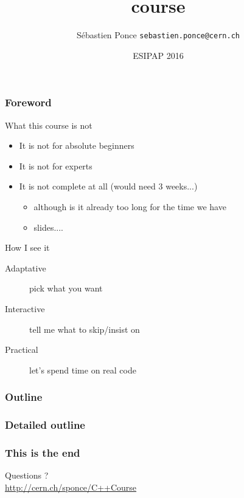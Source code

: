 \documentclass[compress]{beamer}
\title{\cpp course}
\author[S. Ponce]{S\'ebastien Ponce  \texttt{sebastien.ponce@cern.ch}}
\institute{CERN}
\date{ESIPAP 2016}
\begin{document}
\begin{frame}
  \titlepage
\end{frame}

\begin{frame}
  \frametitle{Foreword}
  \begin{block}{What this course is not}
    \begin{itemize}
    \item It is not for absolute beginners
    \item It is not for experts
    \item It is not complete at all (would need 3 weeks...)
      \begin{itemize}
      \item although is it already too long for the time we have
      \item \inserttotalframenumber{} slides....
      \end{itemize}
    \end{itemize}
  \end{block}
  \begin{block}{How I see it}
    \begin{description}
    \item[Adaptative] pick what you want
    \item[Interactive] tell me what to skip/insist on
    \item[Practical] let's spend time on real code
    \end{description}
  \end{block}
\end{frame}

\begin{frame}
  \frametitle{Outline}
  \tableofcontents[sectionstyle=show,subsectionstyle=hide]
\end{frame}

\begin{frame}
  \frametitle{Detailed outline}
  \vspace{-0.5cm}
  \begin{scriptsize}
    \begin{multicols}{2}
      \tableofcontents[sectionstyle=show,subsectionstyle=show]
    \end{multicols}
  \end{scriptsize}
\end{frame}







\begin{frame}
  \frametitle{This is the end}
  \begin{center}
    \Huge Questions ?\\
    \vspace{.5cm}
    \tiny \href{http://cern.ch/sponce/C++Course}{http://cern.ch/sponce/C++Course}
  \end{center}
\end{frame}
\end{document}
